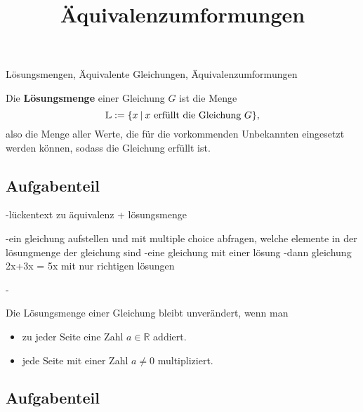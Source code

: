 \documentclass[solution]{uebungsblatt}
\title{Äquivalenzumformungen}
\begin{document}
\maketitle
\begin{contents}
    Lösungsmengen, Äquivalente Gleichungen, Äquivalenzumformungen
\end{contents}


\begin{definition}
    Die \textbf{Lösungsmenge} einer Gleichung $G$ ist die Menge 
    \[\mathbb{L}:=\{x\:|\:x~\text{erfüllt die Gleichung~}G\},\]
    also die Menge aller Werte, die für die vorkommenden Unbekannten eingesetzt werden können, sodass die Gleichung erfüllt ist.
\end{definition}

\subsection*{Aufgabenteil}

-lückentext zu äquivalenz + lösungsmenge

-ein gleichung aufstellen und mit multiple choice abfragen,
welche elemente in der lösungmenge der gleichung sind 
    -eine gleichung mit einer lösung 
    -dann gleichung 2x+3x = 5x mit nur richtigen lösungen 

-

\newpage


\begin{theorem}
    Die Lösungsmenge einer Gleichung bleibt unverändert, wenn man
    \begin{itemize}
        \item zu jeder Seite eine Zahl $a\in\mathbb{R}$ addiert.
        \item jede Seite mit einer Zahl $a\neq 0$ multipliziert.
    \end{itemize}
\end{theorem}

\subsection*{Aufgabenteil}
\end{document}
